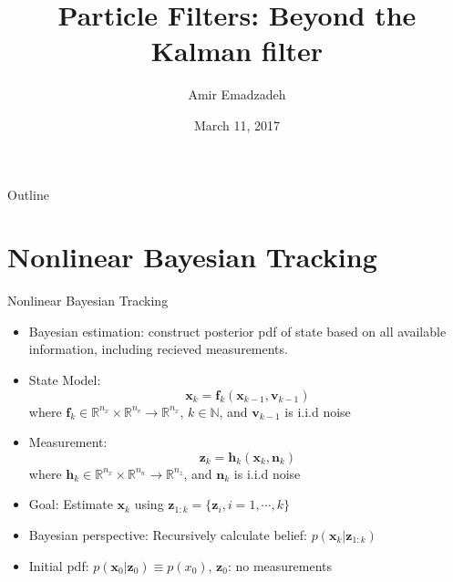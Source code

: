 \documentclass{beamer}
\title{Particle Filters: Beyond the Kalman filter}
\author{Amir Emadzadeh} %
\date{March 11, 2017}
\newcommand{\x}{\mathbf{x}}
\newcommand{\z}{\mathbf{z}}
\begin{document}
\begin{frame}
  \titlepage
\end{frame}

\begin{frame}{Outline}
  \tableofcontents
\end{frame}



\section{Nonlinear Bayesian Tracking}

\begin{frame}{Nonlinear Bayesian Tracking}%
  \begin{itemize}
  	\item {
    	Bayesian estimation: construct posterior pdf of 		state based on all available information, including recieved measurements. 
    }
    \item{State Model:
    $$
    \mathbf{x}_k = \mathbf{f}_k(\mathbf{x}_{k-1}, 	\mathbf{v}_{k-1})
	$$
	where $\mathbf{f}_k \in \mathbb{R}^{n_x} \times \mathbb{R}^{n_v} \rightarrow \mathbb{R}^{n_x}$, $k \in \mathbb{N}$, and $\mathbf{v}_{k-1}$ is i.i.d noise
	}
	\item{ Measurement:
	$$
\mathbf{z}_k = \mathbf{h}_k(\mathbf{x}_k, \mathbf{n}_k)		
	$$
	where $\mathbf{h}_k \in \mathbb{R}^{n_x} \times \mathbb{R}^{n_n} \rightarrow \mathbb{R}^{n_z}$, and $\mathbf{n}_k$ is i.i.d noise
	}
	\item{ Goal: Estimate $\mathbf{x}_k$ using  $
\mathbf{z}_{1:k}=\{\mathbf{z}_i, i=1, \cdots, k \}$ 
	}
	\item{Bayesian perspective: Recursively calculate belief: $p(\x_k|\z_{1:k})$
	}
	\item{Initial pdf: $p(\x_0|\z_0) \equiv p(x_0)$, $\z_0$: no measurements 
	}
  \end{itemize}
\end{frame}
\end{document}
